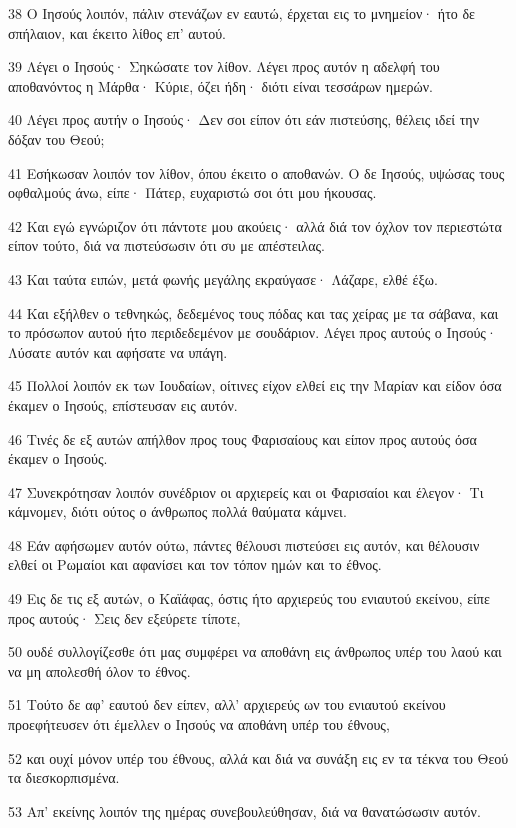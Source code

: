 \par 38 Ο Ιησούς λοιπόν, πάλιν στενάζων εν εαυτώ, έρχεται εις το μνημείον· ήτο δε σπήλαιον, και έκειτο λίθος επ' αυτού.
\par 39 Λέγει ο Ιησούς· Σηκώσατε τον λίθον. Λέγει προς αυτόν η αδελφή του αποθανόντος η Μάρθα· Κύριε, όζει ήδη· διότι είναι τεσσάρων ημερών.
\par 40 Λέγει προς αυτήν ο Ιησούς· Δεν σοι είπον ότι εάν πιστεύσης, θέλεις ιδεί την δόξαν του Θεού;
\par 41 Εσήκωσαν λοιπόν τον λίθον, όπου έκειτο ο αποθανών. Ο δε Ιησούς, υψώσας τους οφθαλμούς άνω, είπε· Πάτερ, ευχαριστώ σοι ότι μου ήκουσας.
\par 42 Και εγώ εγνώριζον ότι πάντοτε μου ακούεις· αλλά διά τον όχλον τον περιεστώτα είπον τούτο, διά να πιστεύσωσιν ότι συ με απέστειλας.
\par 43 Και ταύτα ειπών, μετά φωνής μεγάλης εκραύγασε· Λάζαρε, ελθέ έξω.
\par 44 Και εξήλθεν ο τεθνηκώς, δεδεμένος τους πόδας και τας χείρας με τα σάβανα, και το πρόσωπον αυτού ήτο περιδεδεμένον με σουδάριον. Λέγει προς αυτούς ο Ιησούς· Λύσατε αυτόν και αφήσατε να υπάγη.
\par 45 Πολλοί λοιπόν εκ των Ιουδαίων, οίτινες είχον ελθεί εις την Μαρίαν και είδον όσα έκαμεν ο Ιησούς, επίστευσαν εις αυτόν.
\par 46 Τινές δε εξ αυτών απήλθον προς τους Φαρισαίους και είπον προς αυτούς όσα έκαμεν ο Ιησούς.
\par 47 Συνεκρότησαν λοιπόν συνέδριον οι αρχιερείς και οι Φαρισαίοι και έλεγον· Τι κάμνομεν, διότι ούτος ο άνθρωπος πολλά θαύματα κάμνει.
\par 48 Εάν αφήσωμεν αυτόν ούτω, πάντες θέλουσι πιστεύσει εις αυτόν, και θέλουσιν ελθεί οι Ρωμαίοι και αφανίσει και τον τόπον ημών και το έθνος.
\par 49 Εις δε τις εξ αυτών, ο Καϊάφας, όστις ήτο αρχιερεύς του ενιαυτού εκείνου, είπε προς αυτούς· Σεις δεν εξεύρετε τίποτε,
\par 50 ουδέ συλλογίζεσθε ότι μας συμφέρει να αποθάνη εις άνθρωπος υπέρ του λαού και να μη απολεσθή όλον το έθνος.
\par 51 Τούτο δε αφ' εαυτού δεν είπεν, αλλ' αρχιερεύς ων του ενιαυτού εκείνου προεφήτευσεν ότι έμελλεν ο Ιησούς να αποθάνη υπέρ του έθνους,
\par 52 και ουχί μόνον υπέρ του έθνους, αλλά και διά να συνάξη εις εν τα τέκνα του Θεού τα διεσκορπισμένα.
\par 53 Απ' εκείνης λοιπόν της ημέρας συνεβουλεύθησαν, διά να θανατώσωσιν αυτόν.
